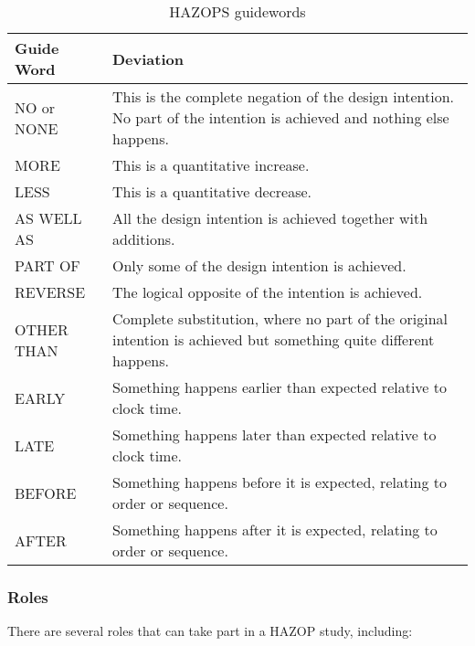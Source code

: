 \begin{table}[!h]
\centering
\begin{tabular}{lp{11cm}}
 \toprule
      \textbf{Guide Word} & \textbf{Deviation}\\
 \midrule
      NO or NONE & This is the complete negation of the design intention. No
      part of the intention is achieved and nothing else happens.\\
      MORE & This is a quantitative increase.\\
      LESS & This is a quantitative decrease.\\
      AS WELL AS & All the design intention is achieved together with additions.\\
      PART OF & Only some of the design intention is achieved. \\
      REVERSE & The logical opposite of the intention is achieved.\\
      OTHER THAN & Complete substitution, where no part of the original
      intention is achieved but something quite different happens. \\
    EARLY  & Something happens earlier than expected relative to clock time.\\
    LATE & Something happens later than expected relative to clock time. \\
    BEFORE & Something happens before it is expected, relating to
    order or sequence.\\
    AFTER & Something happens after it is expected, relating to order or sequence.\\
\bottomrule
\end{tabular}
\caption{HAZOPS guidewords}
\label{tab:safety:hazop-guidewords}
\end{table}


\subsubsection*{Roles}

There are several roles that can take part in a HAZOP study, including:

